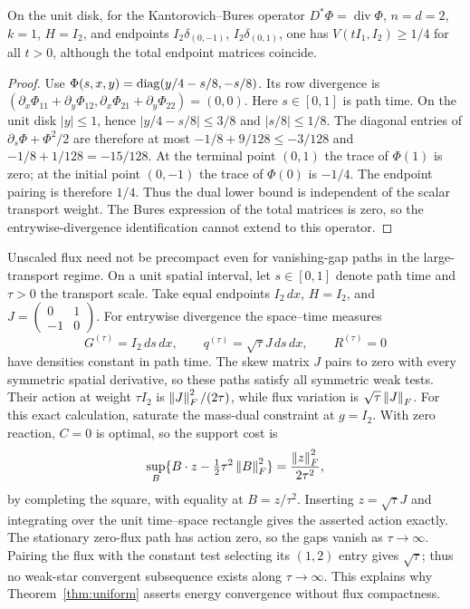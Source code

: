 \begin{proposition}\label{prop:operator}
On the unit disk, for the Kantorovich--Bures operator
$D^*\Phi=\operatorname{div}\Phi$,
$n=d=2$, $k=1$, $H=I_2$, and endpoints
$I_2\delta_{(0,-1)}$, $I_2\delta_{(0,1)}$, one has $V(tI_1,I_2)\ge1/4$
for all $t>0$, although the total endpoint matrices coincide.
\end{proposition}
\begin{proof}
Use $\Phi(s,x,y)=\operatorname{diag}(y/4-s/8,-s/8)$. Its row divergence is
$(\partial_x\Phi_{11}+\partial_y\Phi_{12},
  \partial_x\Phi_{21}+\partial_y\Phi_{22})=(0,0)$.
Here $s\in[0,1]$ is path time. On the unit disk $|y|\le1$, hence
$|y/4-s/8|\le3/8$ and $|s/8|\le1/8$. The diagonal entries of
$\partial_s\Phi+\Phi^2/2$ are therefore at most
$-1/8+9/128\le-3/128$ and $-1/8+1/128=-15/128$.
At the terminal point $(0,1)$ the trace of $\Phi(1)$ is zero; at the
initial point $(0,-1)$ the trace of $\Phi(0)$ is $-1/4$. The endpoint
pairing is therefore $1/4$. Thus the dual lower bound is independent
of the scalar transport weight. The Bures expression of the total matrices
is zero, so the entrywise-divergence identification cannot extend to this
operator.
\end{proof}

\begin{remark}\label{rem:nocompact}
Unscaled flux need not be precompact even for vanishing-gap paths in the
large-transport regime. On a unit spatial interval, let $s\in[0,1]$ denote
path time and $\tau>0$ the transport scale. Take equal endpoints $I_2\,dx$,
$H=I_2$, and $J=\left(\begin{smallmatrix}0&1\\-1&0\end{smallmatrix}\right)$.
For entrywise divergence the space--time measures
\[
 G^{(\tau)}=I_2\,ds\,dx,\qquad
 q^{(\tau)}=\sqrt\tau J\,ds\,dx,\qquad R^{(\tau)}=0
\]
have densities constant in path time. The skew matrix $J$ pairs to zero
with every symmetric spatial derivative, so these paths satisfy all
symmetric weak tests. Their action at weight $\tau I_2$ is
$\left\lVert J\right\rVert_F^2/(2\tau)$, while flux variation is $\sqrt\tau\left\lVert J\right\rVert_F$.
For this exact calculation, saturate the mass-dual constraint at $g=I_2$.
With zero reaction, $C=0$ is optimal, so the support cost is
\[
 \sup_B\{B\cdot z-\tfrac12\tau^2\left\lVert B\right\rVert_F^2\}
 =\frac{\left\lVert z\right\rVert_F^2}{2\tau^2},
\]
by completing the square, with equality at $B=z/\tau^2$. Inserting
$z=\sqrt\tau J$ and integrating over the unit time--space rectangle gives
the asserted action exactly.
The stationary zero-flux path has action zero, so the gaps vanish as
$\tau\to\infty$. Pairing the flux with the constant test selecting its
$(1,2)$ entry gives $\sqrt\tau$; thus no weak-star convergent subsequence
exists along $\tau\to\infty$. This explains why
Theorem~\ref{thm:uniform} asserts energy convergence without flux compactness.
\end{remark}
